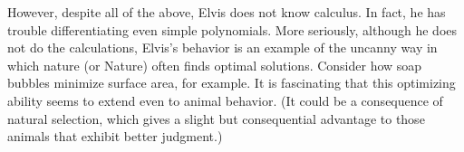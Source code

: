 \documentclass[12pt]{article}
\begin{document}
{However, despite all of the above, Elvis does not know calculus. In fact, he has trouble differentiating even simple polynomials. More seriously,
although he does not do the calculations, Elvis's behavior is an example of the uncanny way in which nature (or Nature) often finds optimal solutions. Consider how
soap bubbles minimize surface area, for example. It is fascinating that this optimizing
ability seems to extend even to animal behavior. (It could be a consequence of natural selection, which gives a slight but consequential advantage to those animals that
exhibit better judgment.) 
}
\end{document}

